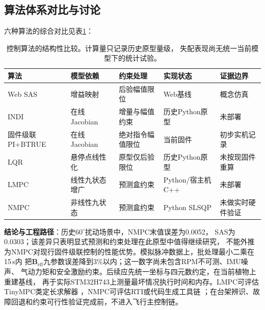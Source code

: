 

\subsection{算法体系对比与讨论}
\label{sec:mpc_discussion}

六种算法的综合对比见表\ref{tab:mpc_algo_compare}：

\begin{table}[H]
\centering
\caption{控制算法的结构性比较。计算量只记录历史原型量级，
失配表现尚无统一当前模型下的统计试验。}
\label{tab:mpc_algo_compare}
\scriptsize
\setlength{\tabcolsep}{2pt}
\begin{tabularx}{\textwidth}{l >{\raggedright\arraybackslash}X >{\raggedright\arraybackslash}X >{\raggedright\arraybackslash}X >{\raggedright\arraybackslash}X}
\toprule
\textbf{算法} & \textbf{模型依赖} & \textbf{约束处理} & \textbf{实现状态} & \textbf{证据边界} \\
\midrule
Web SAS & 增益映射 & 后验幅值限位 & Web基线 & 概念仿真 \\
INDI & 在线Jacobian & 增量与幅值约束 & 历史Python原型 & 未部署 \\
固件级联PI+BTRUE & 在线Jacobian & 绝对指令幅值限位 & 当前固件 & 初步实机记录 \\
LQR & 悬停点线性化 & 原型仅后验限位 & 历史Python原型 & 未按现固件重算 \\
LMPC & 线性九状态增广 & 预测盒约束 & Python/宿主机C++ & 未部署 \\
NMPC & 非线性九状态 & 预测盒约束 & Python SLSQP & 未做实时硬件验证 \\
\bottomrule
\end{tabularx}
\end{table}

\enlargethispage{3\baselineskip}
\textbf{结论与工程路径}：历史$60^\circ$扰动场景中，NMPC末值误差为0.0052，
SAS为0.0303；该差异只表明显式预测和约束处理在此原型中值得继续研究，
不能外推为NMPC对现行固件级联控制的性能优势。模拟脉冲数据上，批处理最小二乘在15\,s内
把$\mathbf B_{\mathrm{eff}}$九参数误差降到$3\%$以内；这一数字尚未包含RPM不可测、IMU噪声、
气动力矩和安全激励约束。后续应先统一坐标与四元数约定，在当前植物上重建基线，
再于实际STM32H743上测量最坏情况执行时间和内存。LMPC可评估TinyMPC类定长求解器
\cite{cassel2024tinympc}，NMPC可评估RTI或代码生成工具链
\cite{verschueren2022acados}；在台架辨识、故障回退和约束可行性验证完成前，不进入飞行主控制链。
